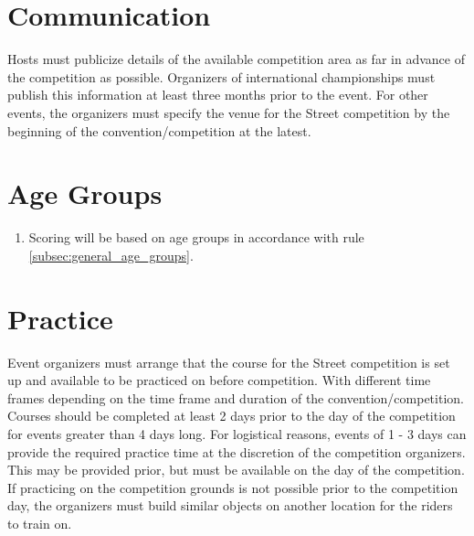 \section{Communication}

Hosts must publicize details of the available competition area as far in advance of the competition as possible.
Organizers of international championships must publish this information at least three months prior to the event.
For other events, the organizers must specify the venue for the Street competition by the beginning of the convention/competition at the latest.

\section{Age Groups}

\begin{enumerate}[leftmargin=1.5em,labelsep=*]
	\item Scoring will be based on age groups in accordance with rule \ref{subsec:general_age_groups}.
\end{enumerate}

\section{Practice}

Event organizers must arrange that the course for the Street competition is set up and available to be practiced on before competition.
With different time frames depending on the time frame and duration of the convention/competition.
Courses should be completed at least 2 days prior to the day of the competition for events greater than 4 days long.
For logistical reasons, events of 1 - 3 days can provide the required practice time at the discretion of the competition organizers.
This may be provided prior, but must be available on the day of the competition.
If practicing on the competition grounds is not possible prior to the competition day, the organizers must build similar objects on another location for the riders to train on.
